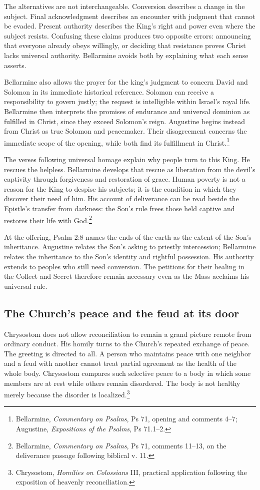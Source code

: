 The alternatives are not interchangeable. Conversion describes a change in the subject. Final acknowledgment describes an encounter with judgment that cannot be evaded. Present authority describes the King's right and power even where the subject resists. Confusing these claims produces two opposite errors: announcing that everyone already obeys willingly, or deciding that resistance proves Christ lacks universal authority. Bellarmine avoids both by explaining what each sense asserts.

Bellarmine also allows the prayer for the king's judgment to concern David and Solomon in its immediate historical reference. Solomon can receive a responsibility to govern justly; the request is intelligible within Israel's royal life. Bellarmine then interprets the promises of endurance and universal dominion as fulfilled in Christ, since they exceed Solomon's reign. Augustine begins instead from Christ as true Solomon and peacemaker. Their disagreement concerns the immediate scope of the opening, while both find its fulfillment in Christ.\footnote{Bellarmine, \emph{Commentary on Psalms}, Ps 71, opening and comments 4--7; Augustine, \emph{Expositions of the Psalms}, Ps 71.1--2.}

The verses following universal homage explain why people turn to this King. He rescues the helpless. Bellarmine develops that rescue as liberation from the devil's captivity through forgiveness and restoration of grace. Human poverty is not a reason for the King to despise his subjects; it is the condition in which they discover their need of him. His account of deliverance can be read beside the Epistle's transfer from darkness: the Son's rule frees those held captive and restores their life with God.\footnote{Bellarmine, \emph{Commentary on Psalms}, Ps 71, comments 11--13, on the deliverance passage following biblical v. 11.}

At the offering, Psalm 2:8 names the ends of the earth as the extent of the Son's inheritance. Augustine relates the Son's asking to priestly intercession; Bellarmine relates the inheritance to the Son's identity and rightful possession. His authority extends to peoples who still need conversion. The petitions for their healing in the Collect and Secret therefore remain necessary even as the Mass acclaims his universal rule.

\subsection{The Church's peace and the feud at its door}
Chrysostom does not allow reconciliation to remain a grand picture remote from ordinary conduct. His homily turns to the Church's repeated exchange of peace. The greeting is directed to all. A person who maintains peace with one neighbor and a feud with another cannot treat partial agreement as the health of the whole body. Chrysostom compares such selective peace to a body in which some members are at rest while others remain disordered. The body is not healthy merely because the disorder is localized.\footnote{Chrysostom, \emph{Homilies on Colossians} III, practical application following the exposition of heavenly reconciliation.}

